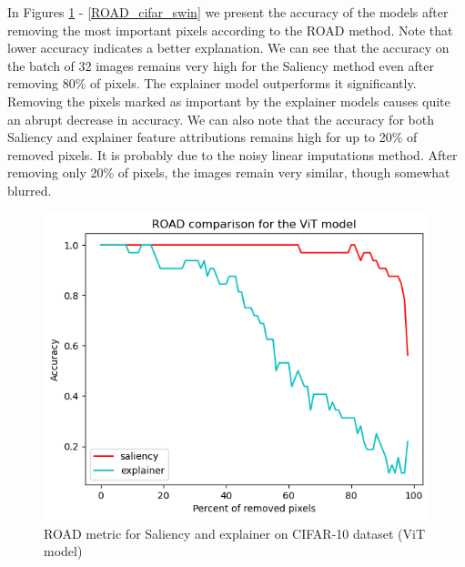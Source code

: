 \documentclass[magisterska,en]{pracamgr}
\begin{document}
In Figures \ref{ROAD_cifar_vit} - \ref{ROAD_cifar_swin} we present the accuracy of the models after removing the most important pixels according to the ROAD method. Note that lower accuracy indicates a better explanation. We can see that the accuracy on the batch of 32 images remains very high for the Saliency method even after removing 80\% of pixels. The explainer model outperforms it significantly. Removing the pixels marked as important by the explainer models causes quite an abrupt decrease in accuracy. We can also note that the accuracy for both Saliency and explainer feature attributions remains high for up to 20\% of removed pixels. It is probably due to the noisy linear imputations method. After removing only 20\% of pixels, the images remain very similar, though somewhat blurred.



\begin{figure}[H]
\centering
\includegraphics[scale=0.5]{./images/ROAD_cifar_vit.png}
\caption{ROAD metric for Saliency and explainer on CIFAR-10 dataset (ViT model)}
\label{ROAD_cifar_vit}
\end{figure}
\end{document}
